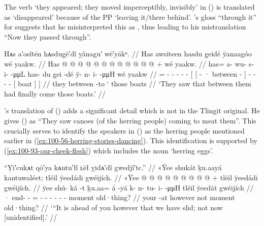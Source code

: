 The verb  ‘they appeared; they moved imperceptibly, invisibly’ in (\lastx) is translated as ‘disappeared’ because of the PP  ‘leaving it/there behind’.
\citeauthor{swanton:1909}’s gloss “through it” for  suggests that he misinterpreted this as , thus leading to his mistranslation “Now they passed through”.

\ex\label{ex:100-90-boats-come}%
%
\begingl
	\glpreamble	Hᴀs a′osîtēn hᴀsdug̣ē′dî ỵânagu′ wē′yākᵘ. //
	\glpreamble	Has awsiteen hasdu g̱eidé ÿanaagóo wé yaakw. //
	\gla	Has @  @ {} @ {} @ {} @ {} @ {}
		{} {}  @ {}  @ {} {}
			 @ {} @ {} @ {} @ {} +
			{} wé yaakw. {} {} //
	\glb	has= a- wu- s- i-  -μμL
		{} {} has- du g̱ei -dé {}
			ÿ- n- i-  -μμH
			{} wé yaakw {} {} //
	\glc	{}= - - - -  -
			{}[ {}[ - · between - {}]
			- - -  -
			{}[  boat {}] {}] //
	\gld	they  {} {} {} {} {}
		{} {}  {} between -to {}
			 {} {} {} {}`
			{} those boats {} {} //
	\glft	‘They saw that between them had finally come those boats.’
		//
\endgl
\xe

\citeauthor{swanton:1909}’s translation of (\lastx) adds a significant detail which is not in the Tlingit original.
He gives (\lastx) as “They saw canoes (of the herring people) coming to meat them”.
This crucially serves to identify the speakers in (\nextx) as the herring people mentioned earlier in (\ref{ex:100-56-herring-stories-dancing}).
This identification is supported by (\ref{ex:100-93-our-cheek-flesh}) which includes the noun  ‘herring eggs’.

\ex\label{ex:100-91-gweijich}%
%
\begingl
	\glpreamble	“Ỵī′cukᴀt qō′ya kᴀntu′łî ʟēł ỵidᴀ′dî gwedjî′tc.” //
	\glpreamble	«\!Ÿee shukát ḵu.aayá kantuwaléet; tléil ÿeedádi gwéijích. //
	\gla	«\!Ÿee  @ {} @ {}  @ {} @ {}
		 @ {} @ {} @ {} @ {} @ {} +
		tléil ÿeedádi gwéijích. //
	\glb	\pqp{}ÿee shú- ká -t ḵu.aa= á -yá
		k- n- tu- i-  -μμH
		tléil ÿeedát gwéijích //
	\glc	\pqp{}· end-  - =  -
		- - - -  -
		 moment old·thing? //
	\gld	\pqp{}your  {} -at however\•  {}
		 {} {} {} {} {}
		not moment old·thing? //
	\glft	‘“It is ahead of you however that we have slid; not now [unidentified].’
		//
\endgl
\xe

